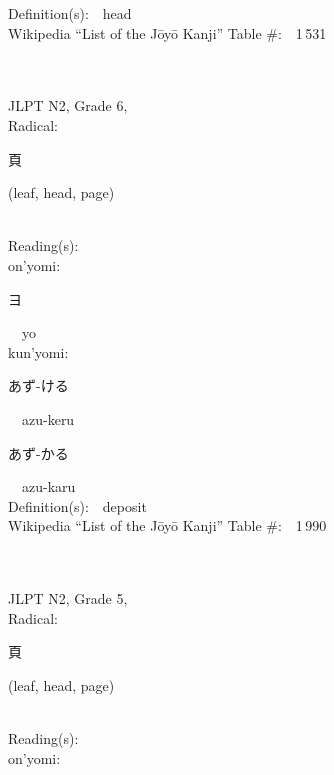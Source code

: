 \begin{multicols}{2}
Definition(s):\ \ head \\
Wikipedia ``List of the J\=oy\=o Kanji'' Table \#:\ \ 1\,531 \\
\ \ \\
{\fontsize{34pt}{40pt}  }\ \ \\  %
{JLPT N2, Grade 6, \\Radical:\ \ {\begin{CJK}{UTF8}{min} 頁 \end{CJK}} (leaf, head, page) } \\
Reading(s):\ \ \\
{\hspace*{1em}}on'yomi:\ \ \\
{\hspace*{2em}}{\begin{CJK}{UTF8}{min} ヨ \end{CJK}}\ \ yo\ \ \\
{\hspace*{1em}}kun'yomi:\ \ \\
{\hspace*{2em}}{\begin{CJK}{UTF8}{min} あず-ける \end{CJK}}\ \ azu-keru\ \ \\
{\hspace*{2em}}{\begin{CJK}{UTF8}{min} あず-かる \end{CJK}}\ \ azu-karu\ \ \\
Definition(s):\ \ deposit \\
Wikipedia ``List of the J\=oy\=o Kanji'' Table \#:\ \ 1\,990 \\
\ \ \\
{\fontsize{34pt}{40pt}  }\ \ \\  %
{JLPT N2, Grade 5, \\Radical:\ \ {\begin{CJK}{UTF8}{min} 頁 \end{CJK}} (leaf, head, page) } \\
Reading(s):\ \ \\
{\hspace*{1em}}on'yomi:\ \ \\

\end{multicols}

